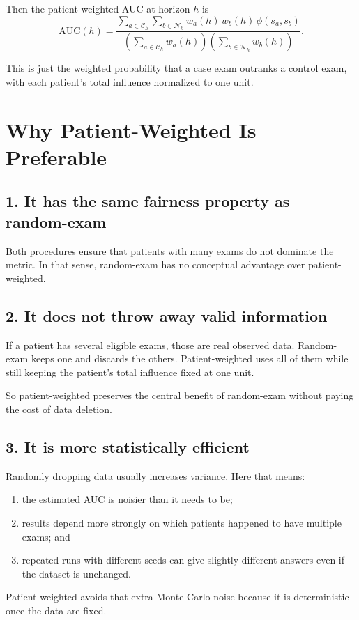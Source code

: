 \documentclass[11pt]{article}
\begin{document}
Then the patient-weighted AUC at horizon $h$ is
\[
\mathrm{AUC}(h)=
\frac{
\sum_{a\in \mathcal{C}_h}\sum_{b\in \mathcal{N}_h}
w_a(h)\,w_b(h)\,\phi(s_a,s_b)
}{
\left(\sum_{a\in \mathcal{C}_h} w_a(h)\right)
\left(\sum_{b\in \mathcal{N}_h} w_b(h)\right)
}.
\]

This is just the weighted probability that a case exam outranks a control exam, with each patient's total influence normalized to one unit.

\section*{Why Patient-Weighted Is Preferable}
\subsection*{1. It has the same fairness property as random-exam}
Both procedures ensure that patients with many exams do not dominate the metric. In that sense, random-exam has no conceptual advantage over patient-weighted.

\subsection*{2. It does not throw away valid information}
If a patient has several eligible exams, those are real observed data. Random-exam keeps one and discards the others. Patient-weighted uses all of them while still keeping the patient's total influence fixed at one unit.

So patient-weighted preserves the central benefit of random-exam without paying the cost of data deletion.

\subsection*{3. It is more statistically efficient}
Randomly dropping data usually increases variance. Here that means:
\begin{enumerate}[leftmargin=2em]
\item the estimated AUC is noisier than it needs to be;
\item results depend more strongly on which patients happened to have multiple exams; and
\item repeated runs with different seeds can give slightly different answers even if the dataset is unchanged.
\end{enumerate}

Patient-weighted avoids that extra Monte Carlo noise because it is deterministic once the data are fixed.
\end{document}
